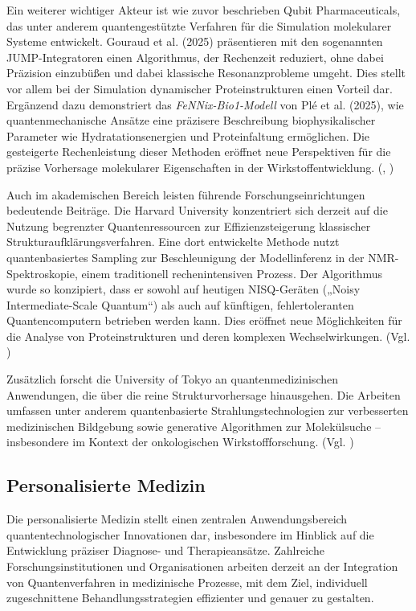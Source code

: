 Ein weiterer wichtiger Akteur ist wie zuvor beschrieben Qubit Pharmaceuticals, das unter anderem quantengestützte Verfahren für die Simulation molekularer Systeme entwickelt. Gouraud et al. (2025) präsentieren mit den sogenannten JUMP-Integratoren einen Algorithmus, der Rechenzeit reduziert, ohne dabei Präzision einzubüßen und dabei klassische Resonanzprobleme umgeht. Dies stellt vor allem bei der Simulation dynamischer Proteinstrukturen einen Vorteil dar. Ergänzend dazu demonstriert das \textit{FeNNix-Bio1-Modell} von Plé et al. (2025), wie quantenmechanische Ansätze eine präzisere Beschreibung biophysikalischer Parameter wie Hydratationsenergien und Proteinfaltung ermöglichen. Die gesteigerte Rechenleistung dieser Methoden eröffnet neue Perspektiven für die präzise Vorhersage molekularer Eigenschaften in der Wirkstoffentwicklung. (\cite{gouraud_velocity_2025}, \cite{ple_foundation_2025})

Auch im akademischen Bereich leisten führende Forschungseinrichtungen bedeutende Beiträge. Die Harvard University konzentriert sich derzeit auf die Nutzung begrenzter Quantenressourcen zur Effizienzsteigerung klassischer Strukturaufklärungsverfahren. Eine dort entwickelte Methode nutzt quantenbasiertes Sampling zur Beschleunigung der Modellinferenz in der NMR-Spektroskopie, einem traditionell rechenintensiven Prozess. Der Algorithmus wurde so konzipiert, dass er sowohl auf heutigen NISQ-Geräten („Noisy Intermediate-Scale Quantum“) als auch auf künftigen, fehlertoleranten Quantencomputern betrieben werden kann. Dies eröffnet neue Möglichkeiten für die Analyse von Proteinstrukturen und deren komplexen Wechselwirkungen. (Vgl. \cite{sels_quantum_2020})

Zusätzlich forscht die University of Tokyo an quantenmedizinischen Anwendungen, die über die reine Strukturvorhersage hinausgehen. Die Arbeiten umfassen unter anderem quantenbasierte Strahlungstechnologien zur verbesserten medizinischen Bildgebung sowie generative Algorithmen zur Molekülsuche – insbesondere im Kontext der onkologischen Wirkstoffforschung. (Vgl. \cite{shimazoe_development_2020})


\subsection*{Personalisierte Medizin}

Die personalisierte Medizin stellt einen zentralen Anwendungsbereich quantentechnologischer Innovationen dar, insbesondere im Hinblick auf die Entwicklung präziser Diagnose- und Therapieansätze. Zahlreiche Forschungsinstitutionen und Organisationen arbeiten derzeit an der Integration von Quantenverfahren in medizinische Prozesse, mit dem Ziel, individuell zugeschnittene Behandlungsstrategien effizienter und genauer zu gestalten.\\

